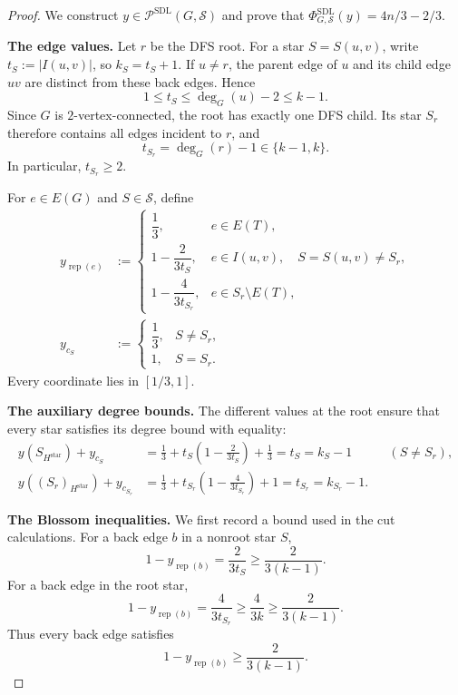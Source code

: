 \documentclass[11pt]{amsart}
\newcommand{\rep}[1]{\operatorname{rep}(#1)}
\newcommand{\1}{\mathbbm{1}}
\newcommand{\Pone}{\mathcal P^{\mathrm{SDL}}}
\newcommand{\PhiOne}{\Phi^{\mathrm{SDL}}}
\begin{document}
\begin{proof}
We construct $y\in\Pone(G,\mathcal S)$ and prove that
$\PhiOne_{G,\mathcal S}(y)=4n/3-2/3$.

\smallskip\noindent
\textbf{The edge values.}
Let $r$ be the DFS root. For a star $S=S(u,v)$, write
$t_S:=|I(u,v)|$, so $k_S=t_S+1$. If $u\ne r$, the parent edge
of $u$ and its child edge $uv$ are distinct from these back
edges. Hence
\[
 1\le t_S\le\deg_G(u)-2\le k-1.
\]
Since $G$ is $2$-vertex-connected, the root has exactly one DFS
child. Its star $S_r$ therefore contains all edges incident to
$r$, and
\[
 t_{S_r}=\deg_G(r)-1\in\{k-1,k\}.
\]
In particular, $t_{S_r}\ge2$.

For $e\in E(G)$ and $S\in\mathcal S$, define
\begin{equation}
\label{eq:k-reciprocal-values}
 \begin{aligned}
 y_{\rep{e}}
 &:=\begin{cases}
    \dfrac13,&e\in E(T),\\[4pt]
    1-\dfrac{2}{3t_S},
       &e\in I(u,v),\quad S=S(u,v)\ne S_r,\\[6pt]
    1-\dfrac{4}{3t_{S_r}},&e\in S_r\setminus E(T),
   \end{cases}\\[6pt]
 y_{c_S}
 &:=\begin{cases}
    \dfrac13,&S\ne S_r,\\[3pt]
    1,&S=S_r.
   \end{cases}
 \end{aligned}
\end{equation}
Every coordinate lies in $[1/3,1]$.

\smallskip\noindent
\textbf{The auxiliary degree bounds.}
The different values at the root ensure that every star satisfies
its degree bound with equality:
\[
 \begin{aligned}
 y(S_{H^{\mathrm{star}}})+y_{c_S}
 &=\frac13+t_S\left(1-\frac{2}{3t_S}\right)+\frac13
   =t_S=k_S-1
   &&(S\ne S_r),\\[3pt]
 y((S_r)_{H^{\mathrm{star}}})+y_{c_{S_r}}
 &=\frac13+t_{S_r}\left(1-\frac{4}{3t_{S_r}}\right)+1
   =t_{S_r}=k_{S_r}-1.
 \end{aligned}
\]

\smallskip\noindent
\textbf{The Blossom inequalities.}
We first record a bound used in the cut calculations. For a back
edge $b$ in a nonroot star $S$,
\[
 1-y_{\rep{b}}=\frac{2}{3t_S}\ge\frac{2}{3(k-1)}.
\]
For a back edge in the root star,
\[
 1-y_{\rep{b}}=\frac{4}{3t_{S_r}}
 \ge\frac{4}{3k}\ge\frac{2}{3(k-1)}.
\]
Thus every back edge satisfies
\begin{equation}
\label{eq:k-cut-coverage}
 1-y_{\rep{b}}\ge\frac{2}{3(k-1)}.
\end{equation}


\end{proof}
\end{document}
